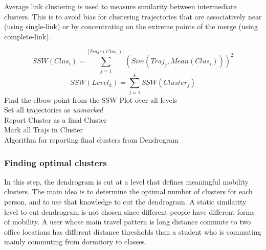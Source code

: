 Average link clustering is used to measure similarity between intermediate clusters. This is to avoid bias for clustering trajectories that are associatively near (using single-link) or by concentrating on the extreme points of the merge (using complete-link).%
\begin{algorithm}

\SetAlgoLined
{}
{
\begin{equation}
SSW(Clus_i)= \sum_{j=1}^{|Trajs(Clus_i)|}{(Sim(Traj_{j},Mean(Clus_i)))^{2}}
\end{equation}
\begin{equation}
SSW(Level_k)=\sum_{j=1}^{k}{SSW(Cluster_j)}
\end{equation}
}
Find the elbow point from the SSW Plot over all levels \\
Set all trajectories as \textit{unmarked}\\
{
{
{
Report Cluster as a final Cluster\\
Mark all Trajs in Cluster
}
}
}
\\

\caption{Algorithm for reporting final clusters from Dendrogram}

\end{algorithm}
\subsubsection{Finding optimal clusters}
In this step, the dendrogram is cut at a level that defines meaningful mobility clusters. The main idea is to determine the optimal number of clusters for each person, and to use that knowledge to cut the dendrogram. A static similarity level to cut dendrogram is not chosen since different people have different forms of mobility. A user whose main travel pattern is long distance commute to two office locations has different distance thresholds than a student who is commuting mainly commuting from dormitory to classes. 

